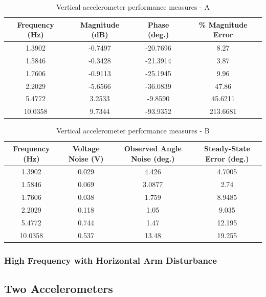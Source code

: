 \documentclass{article}
\theoremstyle{plain}
\theoremstyle{definition}
\theoremstyle{remark}
\begin{document}
\begin{table}
\begin{center}
    \begin{tabular}{|c|c|c|c|}
        \hline
        Frequency (Hz)  & Magnitude (dB) & Phase (deg.) & \% Magnitude Error \\ \hline
	1.3902  & -0.7497  & -20.7696 & 8.27\\
       1.5846  & -0.3428  & -21.3914 & 3.87 \\
	1.7606  & -0.9113 & -25.1945 & 9.96  \\
	2.2029 & -5.6566  & -36.0839 & 47.86   \\
	5.4772 & 3.2533  & -9.8590 & 45.6211  \\
	10.0358 & 9.7344 & -93.9352 & 213.6681 \\
        \hline
    \end{tabular}
\caption{Vertical accelerometer performance measures - A}  
\label{vertical_tableA}
\end{center}
\end{table}

\begin{table}
\begin{center}
    \begin{tabular}{|c|c|c|c|}
        \hline
        Frequency (Hz)  & Voltage Noise (V) & Observed Angle Noise (deg.) & Steady-State Error (deg.) \\ \hline
	1.3902  & 0.029  & 4.426 & 4.7005\\
       1.5846  & 0.069  & 3.0877 & 2.74 \\
	1.7606  & 0.038 & 1.759 & 8.9485  \\
	2.2029 & 0.118  & 1.05 & 9.035   \\
	5.4772 & 0.744  & 1.47 & 12.195  \\
	10.0358 & 0.537 & 13.48 & 19.255 \\
        \hline
    \end{tabular}
\caption{Vertical accelerometer performance measures - B}  
\label{vertical_tableB}
\end{center}
\end{table}


\subsubsection{High Frequency with Horizontal Arm Disturbance}
\clearpage
\subsection{Two Accelerometers}
\end{document}
